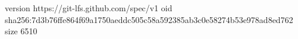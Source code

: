 version https://git-lfs.github.com/spec/v1
oid sha256:7d3b76ffe864f69a1750aeddc505c58a592385ab3c0e58274b53e978ad8ed762
size 6510
